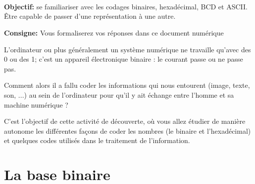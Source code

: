 \documentclass{article}
\begin{document}
\begin{center}
	\begin{flushright}
		\begin{Form}
			\\
			\\
			\\
		\end{Form}
	\end{flushright}

	\vspace{1em}
	\Large
	\textbf{Objectif:} se familiariser avec les codages binaires, hexadécimal, BCD et ASCII. Être capable de passer d'une représentation à une autre.

	\vspace{2em}
	\large
	\textbf{Consigne:} Vous formaliserez vos réponses dans ce document numérique
\end{center}
	\vspace{1em}

	L'ordinateur ou plus généralement un système numérique ne travaille qu'avec des \og{}0\fg{} ou des \og{}1\fg{}; 
	c'est un appareil électronique \og{}binaire\fg{} : le courant passe ou ne passe pas.

	Comment alors il a fallu coder les informations qui nous entourent (image, texte, son, ...) au
	sein de l'ordinateur pour qu'il y ait échange entre l'homme et sa machine numérique ?

	C'est l'objectif de cette activité de découverte, où vous allez étudier de manière autonome les
	différentes façons de coder les nombres (le binaire et l'hexadécimal) et quelques codes utilisés
	dans le traitement de l'information.

\section{La base binaire}
\end{document}
